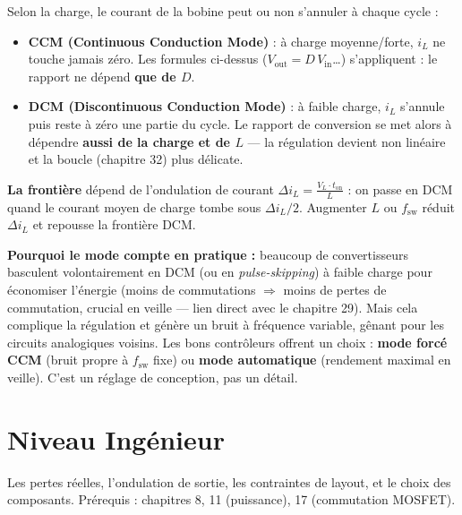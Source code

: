 \documentclass[12pt,a4paper,twoside]{book}
\begin{document}
\begin{formule}
Selon la charge, le courant de la bobine peut ou non s'annuler à chaque cycle :
\begin{itemize}[nosep]
\item \textbf{CCM (Continuous Conduction Mode)} : à charge moyenne/forte, $i_L$ ne touche jamais zéro. Les formules ci-dessus ($V_{\text{out}} = D\,V_{\text{in}}$\ldots) s'appliquent : le rapport ne dépend \textbf{que de $D$}.
\item \textbf{DCM (Discontinuous Conduction Mode)} : à faible charge, $i_L$ s'annule puis reste à zéro une partie du cycle. Le rapport de conversion se met alors à dépendre \textbf{aussi de la charge et de $L$} --- la régulation devient non linéaire et la boucle (chapitre 32) plus délicate.
\end{itemize}

\textbf{La frontière} dépend de l'ondulation de courant $\Delta i_L = \frac{V_L \cdot t_{\text{on}}}{L}$ : on passe en DCM quand le courant moyen de charge tombe sous $\Delta i_L / 2$. Augmenter $L$ ou $f_{\text{sw}}$ réduit $\Delta i_L$ et repousse la frontière DCM.
\end{formule}

\begin{intuition}
\textbf{Pourquoi le mode compte en pratique :} beaucoup de convertisseurs basculent volontairement en DCM (ou en \textit{pulse-skipping}) à faible charge pour économiser l'énergie (moins de commutations $\Rightarrow$ moins de pertes de commutation, crucial en veille --- lien direct avec le chapitre 29). Mais cela complique la régulation et génère un bruit à fréquence variable, gênant pour les circuits analogiques voisins. Les bons contrôleurs offrent un choix : \textbf{mode forcé CCM} (bruit propre à $f_{\text{sw}}$ fixe) ou \textbf{mode automatique} (rendement maximal en veille). C'est un réglage de conception, pas un détail.
\end{intuition}

\section{Niveau Ingénieur}

\begin{ingenieur}
Les pertes réelles, l'ondulation de sortie, les contraintes de layout, et le choix des composants. Prérequis : chapitres 8, 11 (puissance), 17 (commutation MOSFET).
\end{ingenieur}
\end{document}
